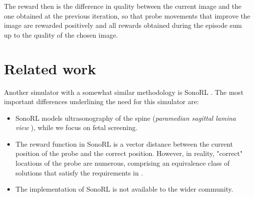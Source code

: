 The reward then is the difference in quality between the current image and the one obtained at the previous iteration, so that probe movements that improve the image are rewarded positively and all rewards obtained during the episode sum up to the quality of the chosen image.

\newpage
\section{Related work}

Another simulator with a somewhat similar methodology is SonoRL \cite{sonorl}. The most important differences underlining the need for this simulator are:
\begin{itemize}
    \item SonoRL models ultrasonography of the spine (\emph{paramedian sagittal lamina view} \cite{spinal-guidelines}), while we focus on fetal screening.
    \item The reward function in SonoRL is a vector distance between the current position of the probe and the correct position. However, in reality, "correct" locations of the probe are numerous, comprising an equivalence class of solutions that satisfy the requirements in \cite{isoug-guidelines}.
    \item The implementation of SonoRL is not available to the wider community.
\end{itemize}